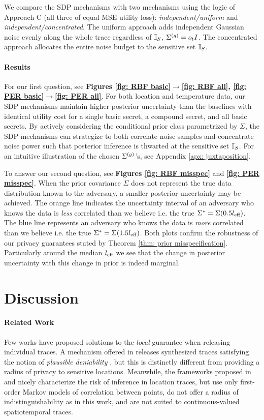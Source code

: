 We compare the SDP mechanisms with two mechanisms using the logic of Approach C (all three of equal MSE utility loss): \emph{independent/uniform} and \emph{independent/concentrated}. The uniform approach adds independent Gaussian noise evenly along the whole trace regardless of ${\mathbb{I}_S}$, $\Sigma^{(g)} = o_tI$. The concentrated approach allocates the entire noise budget to the sensitive set ${\mathbb{I}_S}$. 
\paragraph{Results}
For our first question, see \textbf{Figures \ref{fig: RBF basic}$\rightarrow$\ref{fig: RBF all}, \ref{fig: PER basic}$\rightarrow$\ref{fig: PER all}}. For both location and temperature data, our SDP mechanisms maintain higher posterior uncertainty than the baselines with identical utility cost for a single basic secret, a compound secret, and all basic secrets. By actively considering the conditional prior class parametrized by $\Sigma$, the SDP mechanisms can strategize to both correlate noise samples and concentrate noise power such that posterior inference is thwarted at the sensitive set ${\mathbb{I}_S}$. For an intuitive illustration of the chosen $\Sigma^{(g)}$'s, see Appendix \ref{apx: juxtaposition}. 

To answer our second question, see \textbf{Figures \ref{fig: RBF misspec}} and \textbf{\ref{fig: PER misspec}}. When the prior covariance $\Sigma$ does not represent the true data distribution known to the adversary, a smaller posterior uncertainty may be achieved. The orange line indicates the uncertainty interval of an adversary who knows the data is \emph{less} correlated than we believe i.e. the true $\Sigma^* = \Sigma(0.5 l_{\text{eff}})$. The blue line represents an adversary who knows the data is \emph{more} correlated than we believe i.e. the true $\Sigma^* = \Sigma(1.5 l_{\text{eff}})$. Both plots confirm the robustness of our privacy guarantees stated by Theorem \ref{thm: prior misspecification}. Particularly around the median $l_{\text{eff}}$ we see that the change in posterior uncertainty with this change in prior is indeed marginal. 

\section{Discussion}
\paragraph{Related Work}
Few works have proposed solutions to the \emph{local} guarantee when releasing individual traces. A mechanism offered in \cite{synthesizing_plausible_deniability} releases synthesized traces satisfying the notion of \emph{plausible deniability} \citep{plausible_deniability}, but this is distinctly different from providing a radius of privacy to sensitive locations. Meanwhile, the frameworks proposed in \cite{temporal} and \cite{priste} nicely characterize the risk of inference in location traces, but use only first-order Markov models of correlation between points, do not offer a radius of indistinguishability as in this work, and are not suited to continuous-valued spatiotemporal traces.

